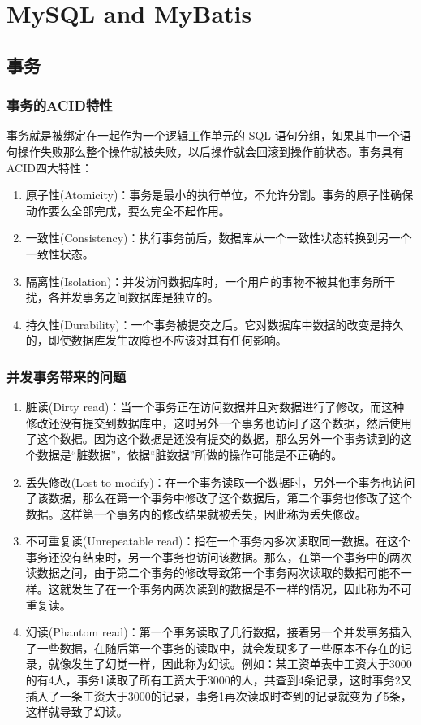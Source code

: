 \chapter{MySQL and MyBatis}
\section{事务}
\subsection{事务的ACID特性}
事务就是被绑定在一起作为一个逻辑工作单元的 SQL 语句分组，如果其中一个语句操作失败那么整个操作就被失败，以后操作就会回滚到操作前状态。事务具有ACID四大特性：
\begin{enumerate}
    \item 原子性(Atomicity)：事务是最小的执行单位，不允许分割。事务的原子性确保动作要么全部完成，要么完全不起作用。
    \item 一致性(Consistency)：执行事务前后，数据库从一个一致性状态转换到另一个一致性状态。
    \item 隔离性(Isolation)：并发访问数据库时，一个用户的事物不被其他事务所干扰，各并发事务之间数据库是独立的。
    \item 持久性(Durability)：一个事务被提交之后。它对数据库中数据的改变是持久的，即使数据库发生故障也不应该对其有任何影响。
\end{enumerate}

\subsection{并发事务带来的问题}
\begin{enumerate}
    \item 脏读(Dirty read)：当一个事务正在访问数据并且对数据进行了修改，而这种修改还没有提交到数据库中，这时另外一个事务也访问了这个数据，然后使用了这个数据。因为这个数据是还没有提交的数据，那么另外一个事务读到的这个数据是“脏数据”，依据“脏数据”所做的操作可能是不正确的。
    \item 丢失修改(Lost to modify)：在一个事务读取一个数据时，另外一个事务也访问了该数据，那么在第一个事务中修改了这个数据后，第二个事务也修改了这个数据。这样第一个事务内的修改结果就被丢失，因此称为丢失修改。
    \item 不可重复读(Unrepeatable read)：指在一个事务内多次读取同一数据。在这个事务还没有结束时，另一个事务也访问该数据。那么，在第一个事务中的两次读数据之间，由于第二个事务的修改导致第一个事务两次读取的数据可能不一样。这就发生了在一个事务内两次读到的数据是不一样的情况，因此称为不可重复读。
    \item 幻读(Phantom read)：第一个事务读取了几行数据，接着另一个并发事务插入了一些数据，在随后第一个事务的读取中，就会发现多了一些原本不存在的记录，就像发生了幻觉一样，因此称为幻读。例如：某工资单表中工资大于3000的有4人，事务1读取了所有工资大于3000的人，共查到4条记录，这时事务2又插入了一条工资大于3000的记录，事务1再次读取时查到的记录就变为了5条，这样就导致了幻读。
\end{enumerate}

